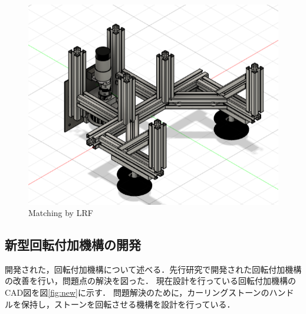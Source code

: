 \documentclass{classes/sice-si}
\begin{document}
\begin{figure}[H]
\begin{minipage}{0.45\linewidth}
        \centering
        \includegraphics[width=\linewidth]{figures/3.png}
        \caption{Matching by LRF}
        \label{fig:3}
    \end{minipage}
    \vspace{0pt} %
\end{figure}
\subsection{新型回転付加機構の開発}
開発された，回転付加機構について述べる．先行研究で開発された回転付加機構の改善を行い，問題点の解決を図った．
現在設計を行っている回転付加機構のCAD図を図\ref{fig:new}に示す．
問題解決のために，カーリングストーンのハンドルを保持し，ストーンを回転させる機構を設計を行っている．
\end{document}
